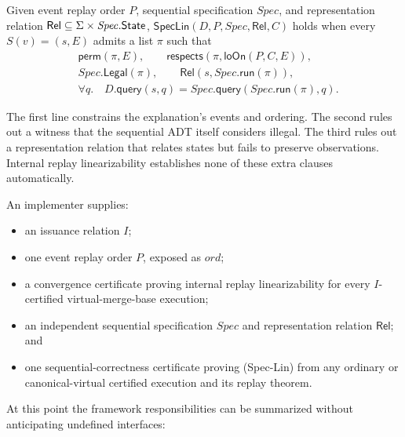 \begin{definition}
Given event replay order $P$, sequential specification $\mathit{Spec}$, and
representation relation
$\mathsf{Rel}\subseteq\Sigma\times\mathit{Spec}.\mathsf{State}$,
$\mathsf{SpecLin}(D,P,\mathit{Spec},\mathsf{Rel},C)$ holds when every
$S(v)=(s,E)$ admits a list $\pi$ such that
\[
\begin{aligned}
 &\mathsf{perm}(\pi,E),\qquad
 \mathsf{respects}(\pi,\mathsf{loOn}(P,C,E)),\\
 &\mathit{Spec}.\mathsf{Legal}(\pi),\qquad
 \mathsf{Rel}(s,\mathit{Spec}.\mathsf{run}(\pi)),\\
 &\forall q.\quad
 D.\mathsf{query}(s,q)=
 \mathit{Spec}.\mathsf{query}(\mathit{Spec}.\mathsf{run}(\pi),q).
\end{aligned}
\tag*{(Spec-Lin)}
\]
\hfill{}
\end{definition}

The first line constrains the explanation's events and ordering. The second
rules out a witness that the sequential ADT itself considers illegal. The
third rules out a representation relation that relates states but fails to
preserve observations. Internal replay linearizability establishes none of
these extra clauses automatically.

\begin{definition}
An implementer supplies:
\begin{itemize}
\item an issuance relation $I$;
\item one event replay order $P$, exposed as $ord$;
\item a convergence certificate proving internal replay linearizability for
every $I$-certified virtual-merge-base execution;
\item an independent sequential specification $\mathit{Spec}$ and representation
relation $\mathsf{Rel}$; and
\item one sequential-correctness certificate proving (Spec-Lin) from any
ordinary or canonical-virtual certified execution and its replay theorem.
\end{itemize}
\hfill{}
\end{definition}

At this point the framework responsibilities can be summarized without
anticipating undefined interfaces:

